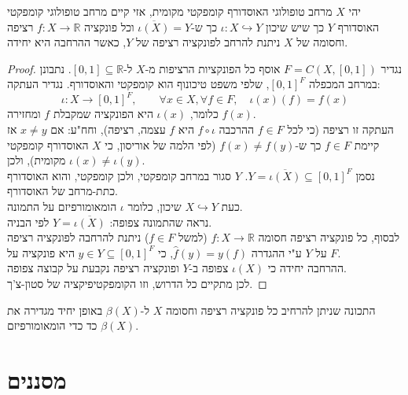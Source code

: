 \documentclass{tstextbook}
\begin{document}
\begin{theorem}[סטון צ'ק]
יהי \(X\) מרחב טופולוגי האוסדורף קומפקטי מקומית, אזי קיים מרחב טופולוגי קומפקטי האוסדורף \(Y\) כך שיש שיכון \(\iota:X\hookrightarrow Y\) כך ש-\(\overline{\iota(X)}=Y\) וכל פונקציה \(f:X\to \mathbb{R}\) רציפה וחסומה של \(X\) ניתנת להרחב לפונקציה רציפה של \(Y\), כאשר ההרחבה היא יחידה.

\end{theorem}
\begin{proof}
נגדיר \(F=C(X,[0,1])\) אוסף כל הפונקציות הרציפות מ-\(X\) ל-\([0,1]\subseteq \mathbb{R}\). נתבונן במרחב המכפלה \([0,1]^{F}\), שלפי משפט טיכונוף הוא קומפקטי והאוסדורף. נגדיר העתקה:
$$\iota :X\to[0,1]^{F},\qquad \forall x \in X, \forall f \in F,\quad \iota(x)(f)=f(x)$$
כלומר, \(\iota(x)\) היא הפונקציה שמקבלת \(f\) ומחזירה \(f(x)\).\\

העתקה זו רציפה (כי לכל \(f\in F\) ההרכבה \(f\circ \iota\) היא \(f\) עצמה, רציפה), וחח"ע: אם \(x\neq y\) אז קיימת \(f\in F\) כך ש-\(f(x)\neq f(y)\) (לפי הלמה של אוריסון, כי \(X\) האוסדורף קומפקטי מקומית), ולכן \(\iota(x)\neq \iota(y)\).\\

נסמן \(Y=\overline{\iota(X)}\subseteq [0,1]^F\). \(Y\) סגור במרחב קומפקטי, ולכן קומפקטי, והוא האוסדורף כתת-מרחב של האוסדורף.\\

כעת \(X\hookrightarrow Y\) שיכון, כלומר \(\iota\) הומאומורפיזם על התמונה.\\

נראה שהתמונה צפופה: \(Y=\overline{\iota(X)}\) לפי הבניה.\\

לבסוף, כל פונקציה רציפה חסומה \(f:X\to\mathbb{R}\) (למשל \(f\in F\)) ניתנת להרחבה לפונקציה רציפה על \(Y\) ע"י ההגדרה \(\hat{f}(y)=y(f)\), כי \(y\in Y\subseteq [0,1]^F\) היא פונקציה על \(F\).\\

ההרחבה יחידה כי \(\iota(X)\) צפופה ב-\(Y\) ופונקציה רציפה נקבעת על קבוצה צפופה.\\

לכן מתקיים כל הדרוש, וזו הקומפקטיפיקציה של סטון-צ'ך.

\end{proof}
\begin{proposition}
התכונה שניתן להרחיב כל פונקציה רציפה וחסומה \(X\) ל-\(\beta(X)\) באופן יחיד מגדירה את \(\beta(X)\) כד כדי הומאומורפיזם.

\end{proposition}
\section{מסננים}
\end{document}
